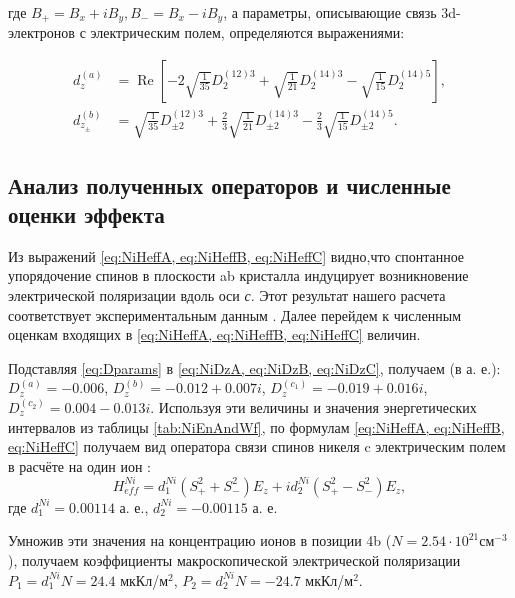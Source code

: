 где $B_{+}=B_{x}+iB_{y}, B_{-}=B_{x}-iB_{y}$, а параметры, описывающие связь 3d-электронов с электрическим полем, определяются выражениями:

\begin{equation}
	\label{eq:CuDz}
	\begin{aligned}
		d_{z}^{(a)}&=\operatorname{Re}\left[-2 \sqrt{\frac{1}{35}} D_{2}^{(12) 3}+\sqrt{\frac{1}{21}} D_{2}^{(14) 3}-\sqrt{\frac{1}{15}} D_{2}^{(14) 5}\right], \\
		d_{z_{\pm}}^{(b)}&=\sqrt{\frac{1}{35}} D_{\pm2}^{(12)3}+\frac{2}{3} \sqrt{\frac{1}{21}} D_{\pm2}^{(14) 3}-\frac{2}{3} \sqrt{\frac{1}{15}} D_{\pm2}^{(14) 5}.
	\end{aligned}
\end{equation}

\subsection{Анализ полученных операторов и численные оценки эффекта}\label{subsec:ch2/sec3/sub3}

Из выражений \cref{eq:NiHeffA, eq:NiHeffB, eq:NiHeffC} видно,что спонтанное упорядочение спинов \niIon в плоскости ab кристалла индуцирует возникновение электрической поляризации вдоль оси \textit{с}. Этот результат нашего расчета соответствует экспериментальным данным \cite{Khanh2013}. Далее перейдем к численным оценкам входящих в \cref{eq:NiHeffA, eq:NiHeffB, eq:NiHeffC} величин.

Подставляя \cref{eq:Dparams} в \cref{eq:NiDzA, eq:NiDzB, eq:NiDzC}, получаем (в а. е.): $D_{z}^{(a)}=-0.006$, $D_{z}^{(b)}=-0.012+0.007 i$, $D_{z}^{\left(c_{1}\right)}=-0.019+0.016 i$, $D_{z}^{\left(c_{2}\right)}=0.004-0.013 i$. Используя эти величины и значения энергетических интервалов из таблицы \cref{tab:NiEnAndWf}, по формулам \cref{eq:NiHeffA, eq:NiHeffB, eq:NiHeffC} получаем вид оператора связи спинов никеля c электрическим полем в расчёте на один ион \niIon:
\begin{equation}
	\label{eq:NiHeffSum}
	H_{eff}^{Ni}=d_{1}^{Ni}\left(S_{+}^{2}+S_{-}^{2}\right) E_{z}+i d_{2}^{Ni}\left(S_{+}^{2}-S_{-}^{2}\right) E_{z},
\end{equation}
где $d_{1}^{Ni}=0.00114$ а. е., $d_{2}^{Ni}=-0.00115$ а. е.

Умножив эти значения на концентрацию ионов в позиции 4b ($N\mathop{=}2.54\mathop{\cdot}10^{21} см^{-3}$), получаем коэффициенты макроскопической электрической поляризации $P_{1}=d_{1}^{Ni}N=24.4$ мкКл/м$^{2}$, $P_{2}=d_{2}^{Ni}N=-24.7$ мкКл/м$^{2}$.


